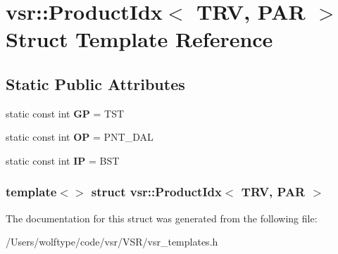 \hypertarget{structvsr_1_1_product_idx_3_01_t_r_v_00_01_p_a_r_01_4}{\section{vsr\-:\-:Product\-Idx$<$ T\-R\-V, P\-A\-R $>$ Struct Template Reference}
\label{structvsr_1_1_product_idx_3_01_t_r_v_00_01_p_a_r_01_4}
}
\subsection*{Static Public Attributes}
\begin{DoxyCompactItemize}
\item 
\hypertarget{structvsr_1_1_product_idx_3_01_t_r_v_00_01_p_a_r_01_4_adf54f09e8dfecf2f924a2fa0e5b64e64}{static const int {\bfseries G\-P} = T\-S\-T}\label{structvsr_1_1_product_idx_3_01_t_r_v_00_01_p_a_r_01_4_adf54f09e8dfecf2f924a2fa0e5b64e64}

\item 
\hypertarget{structvsr_1_1_product_idx_3_01_t_r_v_00_01_p_a_r_01_4_ae835d2716b4097f9bd630991eee3f6da}{static const int {\bfseries O\-P} = P\-N\-T\-\_\-\-D\-A\-L}\label{structvsr_1_1_product_idx_3_01_t_r_v_00_01_p_a_r_01_4_ae835d2716b4097f9bd630991eee3f6da}

\item 
\hypertarget{structvsr_1_1_product_idx_3_01_t_r_v_00_01_p_a_r_01_4_a094d394f2673c85a2b3ea5dc522cf737}{static const int {\bfseries I\-P} = B\-S\-T}\label{structvsr_1_1_product_idx_3_01_t_r_v_00_01_p_a_r_01_4_a094d394f2673c85a2b3ea5dc522cf737}

\end{DoxyCompactItemize}
\subsubsection*{template$<$$>$ struct vsr\-::\-Product\-Idx$<$ T\-R\-V, P\-A\-R $>$}



The documentation for this struct was generated from the following file\-:\begin{DoxyCompactItemize}
\item 
/\-Users/wolftype/code/vsr/\-V\-S\-R/vsr\-\_\-templates.\-h\end{DoxyCompactItemize}
